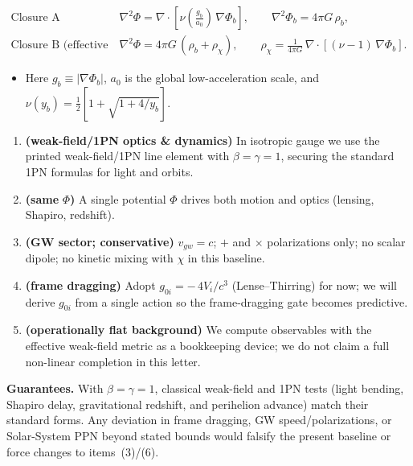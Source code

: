 \documentclass[
]{article}
\begin{document}
\[\begin{aligned}
\text{Closure A (QUMOND-style):}\quad & \nabla^{2}\Phi = \nabla \cdot \left\lbrack \nu\left( \frac{g_{b}}{a_{0}} \right)\,\nabla\Phi_{b} \right\rbrack,\quad\quad\nabla^{2}\Phi_{b} = 4\pi G\,\rho_{b}, \\
\text{Closure B (effective density):}\quad & \nabla^{2}\Phi = 4\pi G\,(\rho_{b} + \rho_{\chi}),\quad\quad\rho_{\chi} = \frac{1}{4\pi G}\,\nabla \cdot \left\lbrack (\nu - 1)\,\nabla\Phi_{b} \right\rbrack.
\end{aligned}\]

\begin{itemize}
\item
  Here \(g_{b} \equiv |\nabla\Phi_{b}|\), \(a_{0}\) is the global
  low-acceleration scale, and
  \(\nu(y_{b}) = \frac{1}{2}\left\lbrack 1 + \sqrt{1 + 4/y_{b}} \right\rbrack\).
\end{itemize}

\begin{enumerate}
\def\labelenumi{\arabic{enumi}.}
\setcounter{enumi}{2}
\item
  \textbf{(weak-field/1PN optics \& dynamics)} In isotropic gauge we use
  the printed weak-field/1PN line element with \(\beta = \gamma = 1\),
  securing the standard 1PN formulas for light and orbits.
\item
  \textbf{(same} \(\Phi\)\textbf{)} A single potential \(\Phi\) drives
  both motion and optics (lensing, Shapiro, redshift).
\item
  \textbf{(GW sector; conservative)} \(v_{gw} = c\); \(+\) and
  \(\times\) polarizations only; no scalar dipole; no kinetic mixing
  with \(\chi\) in this baseline.
\item
  \textbf{(frame dragging)} Adopt \(g_{0i} = - \, 4V_{i}/c^{3}\)
  (Lense--Thirring) for now; we will derive \(g_{0i}\) from a single
  action so the frame-dragging gate becomes predictive.
\item
  \textbf{(operationally flat background)} We compute observables with
  the effective weak-field metric as a bookkeeping device; we do not
  claim a full non-linear completion in this letter.
\end{enumerate}

\textbf{Guarantees.} With \(\beta = \gamma = 1\), classical weak-field
and 1PN tests (light bending, Shapiro delay, gravitational redshift, and
perihelion advance) match their standard forms. Any deviation in frame
dragging, GW speed/polarizations, or Solar-System PPN beyond stated
bounds would falsify the present baseline or force changes to
items~(3)/(6).
\end{document}
